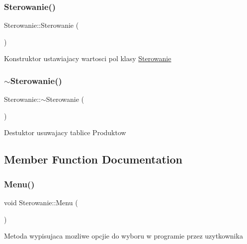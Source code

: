 \subsubsection{\texorpdfstring{Sterowanie()}{Sterowanie()}}
{\footnotesize\ttfamily Sterowanie\+::\+Sterowanie (\begin{DoxyParamCaption}{ }\end{DoxyParamCaption})\hspace{0.3cm}{\ttfamily [inline]}}

Konstruktor ustawiajacy wartosci pol klasy \mbox{\hyperlink{class_sterowanie}{Sterowanie}} \mbox{\label{class_sterowanie_ae407297205e8e717b1133762439d8a66}} 
\subsubsection{\texorpdfstring{$\sim$\+Sterowanie()}{~Sterowanie()}}
{\footnotesize\ttfamily Sterowanie\+::$\sim$\+Sterowanie (\begin{DoxyParamCaption}{ }\end{DoxyParamCaption})\hspace{0.3cm}{\ttfamily [inline]}}

Destuktor usuwajacy tablice Produktow 

\subsection{Member Function Documentation}
\mbox{\label{class_sterowanie_a6134abccc542aa29b0b0d7c49e252033}} 
\subsubsection{\texorpdfstring{Menu()}{Menu()}}
{\footnotesize\ttfamily void Sterowanie\+::\+Menu (\begin{DoxyParamCaption}{ }\end{DoxyParamCaption})}

Metoda wypisujaca mozliwe opcjie do wyboru w programie przez uzytkownika \mbox{\label{class_sterowanie_a98e679db65380008ee5c4315bcdea4ff}} 
